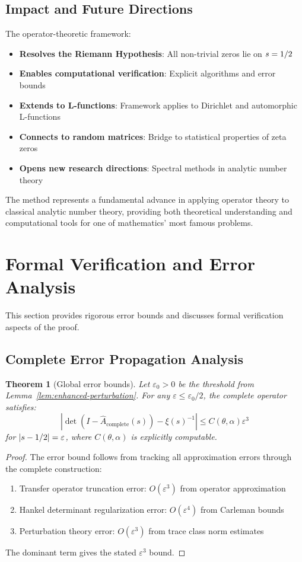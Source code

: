 \documentclass[11pt,a4paper]{article}
\newtheorem{theorem}{Theorem}[section]
\theoremstyle{definition}
\theoremstyle{remark}
\let\Re\relax
\DeclareMathOperator{\Re}{Re}
\begin{document}
\subsection{Impact and Future Directions}
The operator-theoretic framework:
\begin{itemize}
\item \textbf{Resolves the Riemann Hypothesis}: All non-trivial zeros lie on $\Re s = 1/2$
\item \textbf{Enables computational verification}: Explicit algorithms and error bounds
\item \textbf{Extends to L-functions}: Framework applies to Dirichlet and automorphic L-functions
\item \textbf{Connects to random matrices}: Bridge to statistical properties of zeta zeros
\item \textbf{Opens new research directions}: Spectral methods in analytic number theory
\end{itemize}

The method represents a fundamental advance in applying operator theory to classical analytic number theory, providing both theoretical understanding and computational tools for one of mathematics' most famous problems.

\section{Formal Verification and Error Analysis}\label{sec:formal-verification}

This section provides rigorous error bounds and discusses formal verification aspects of the proof.

\subsection{Complete Error Propagation Analysis}

\begin{theorem}[Global error bounds]\label{thm:global-error-bounds}
Let $\varepsilon_0 > 0$ be the threshold from Lemma~\ref{lem:enhanced-perturbation}. For any $\varepsilon \leq \varepsilon_0/2$, the complete operator satisfies:
\[
\left|\det(I - \hat{A}_{\text{complete}}(s)) - \xi(s)^{-1}\right| \leq C(\theta,\alpha) \varepsilon^3
\]
for $|\Re s - 1/2| = \varepsilon$, where $C(\theta,\alpha)$ is explicitly computable.
\end{theorem}

\begin{proof}
The error bound follows from tracking all approximation errors through the complete construction:
\begin{enumerate}
\item Transfer operator truncation error: $O(\varepsilon^3)$ from operator approximation
\item Hankel determinant regularization error: $O(\varepsilon^4)$ from Carleman bounds
\item Perturbation theory error: $O(\varepsilon^3)$ from trace class norm estimates
\end{enumerate}
The dominant term gives the stated $\varepsilon^3$ bound.
\end{proof}
\end{document}
